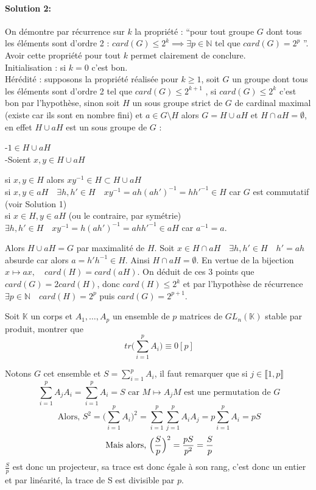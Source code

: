 \documentclass[letterpaper,10pt]{article}
\begin{document}
{\paragraph{Solution 2:}
On démontre par récurrence sur $k$ la propriété : ``pour tout groupe $G$ dont tous les éléments sont d'ordre 2 : $card(G) \leq 2^k \implies \exists p \in \mathbb{N}$ tel que $card(G) = 2^p$ ''. Avoir cette propriété pour tout $k$ permet clairement de conclure. \\
Initialisation :  si $k = 0$ c'est bon.\\
Hérédité : supposons la propriété réalisée pour $k \geq 1$, soit $G$
un groupe dont tous les éléments sont d'ordre 2 tel 
que $card(G) \leq 2^{k+1}$ , si $card(G) \leq 2^k$ c'est bon par 
l'hypothèse, sinon soit $H$ un sous groupe strict de $G$ de cardinal 
maximal (existe car ils sont en nombre fini) et $a \in G\setminus H$ 
alors $G = H \cup aH$ et $H\cap aH=\emptyset$, en effet $H\cup aH$ est 
un sous groupe de $G$ :
\par\leftskip 10pt
-$ 1 \in H\cup aH$\\
-Soient $x,y \in H\cup aH$
\par\leftskip 20pt
si $x,y \in H$ alors $xy^{-1} \in H \subset H\cup aH$\\si $x,y\in aH\quad \exists h,h'\in H \quad xy^{-1} = ah(ah')^{-1} = hh'^{-1} \in H$ car $G$ est commutatif (voir Solution 1)\\ si $x\in H,y\in aH$ (ou le contraire, par symétrie) $\exists h,h'\in H \quad xy^{-1} = h(ah')^{-1} = ahh'^{-1} \in aH$ car $a^{-1} =a$.\par
\leftskip 0pt
Alors $H\cup aH = G$ par maximalité de $H$. Soit $x\in H \cap aH \quad \exists h,h' \in H \quad h' = ah$ absurde car alors $a= h'h^{-1} \in H$. Ainsi $H\cap aH=\emptyset$. En vertue de la bijection $x \mapsto ax,\quad card(H) =card(aH)$. On déduit de ces 3 points que $card(G) = 2card(H)$, donc $card(H) \leq 2^k$ et par l'hypothèse de récurrence $\exists p \in \mathbb{N} \quad card(H) = 2^p$ puis $card(G) = 2^{p+1}$.
}
{
  Soit $\mathbb{K}$ un corps et $A_1, \ldots,A_p$ un ensemble de $p$ matrices de $GL_n(\mathbb{K})$ stable
par produit, montrer que \[\ tr\Biggl(\sum_{i=1}^p A_i\Biggr) \equiv 0\left[p\right] \]
}
{
  Notons $G$ cet ensemble et $S = \sum_{i=1}^pA_i$, il faut remarquer que si $j \in \llbracket 1 , p \rrbracket$ 
\[\ \sum_{i=1}^pA_jA_i = \sum_{i=1}^pA_i = S \text{ car } M \mapsto A_jM \text{ est une permutation de } G \] \[\ \text{Alors, }
S^2 = \Biggl(\sum_{i=1}^pA_i\Biggr)^2 =  \sum_{i=1}^p\sum_{j=1}^pA_iA_j = p\sum_{i=1}^pA_i = pS
\]  \[\ \text{Mais alors, }\Bigl(\frac{S}{p}\Bigr)^2 = \frac{pS}{p^2} = \frac{S}{p} \] $\frac{S}{p}$ est donc un projecteur,  sa trace est donc égale à son rang, c'est donc un entier et par linéarité, la trace de S est divisible par $p$. 

}
\end{document}
